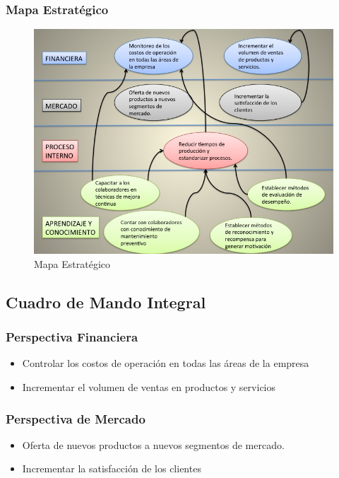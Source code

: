 \documentclass[12pt, a4paper]{article}
\begin{document}
\subsubsection{Mapa Estratégico}

\begin{figure}[H]
  \centering
  
    \includegraphics[width=1.1\textwidth]{Diapositiva1.jpg}
  \captionsetup{justification=centering} %
  \caption{Mapa Estratégico}
  \label{figura:1}
\end{figure}

\subsection{Cuadro de Mando Integral}
\subsubsection{Perspectiva Financiera}
	\begin{itemize}	
	\item Controlar los costos de operación en todas las áreas de la empresa

	\item  Incrementar el volumen de ventas en productos y servicios

\end{itemize}

\subsubsection{Perspectiva de Mercado}
	\begin{itemize}	
		\item Oferta de nuevos productos a nuevos segmentos de mercado.

		\item Incrementar la satisfacción de los clientes
	\end{itemize}
	
\end{document}
